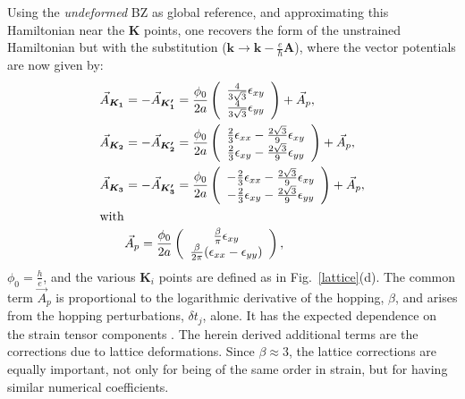 Using the \emph{undeformed} BZ as global reference, and approximating this Hamiltonian near the $\bm{K}$ points, one recovers the form of the unstrained Hamiltonian but with the substitution ($\bm{k} \to \bm{k}-\frac{e}{\hbar} \bm{A}$), where the vector potentials are now given by:
\begin{subequations}\label{pvp-all}
\begin{align}
\vec{A}_{\bm{K_1}}&=-\vec{A}_{\bm{K_1'}}=\frac{\phi_0}{2a} \left( \begin{array}{c} \frac{4}{3\sqrt{3}}\epsilon_{xy}\\ \frac{4}{3 \sqrt{3}} \epsilon_{yy} \end{array} \right) +\vec{A}_p , \label{pvpK1}\\ 
\vec{A}_{\bm{K_2}}&=-\vec{A}_{\bm{K_2'}}=\frac{\phi_0}{2a} \left( \begin{array}{c} \frac{2}{3}\epsilon_{xx}-\frac{2\sqrt{3}}{9} \epsilon_{xy} \\ \frac{2}{3} \epsilon_{xy}-\frac{2 \sqrt{3}}{9} \epsilon_{yy} \end{array} \right)+\vec{A}_p  , \label{pvpK2} \\
\vec{A}_{\bm{K_3}}&=-\vec{A}_{\bm{K_3'}}=\frac{\phi_0}{2a} \left( \begin{array}{c} -\frac{2}{3} \epsilon_{xx}-\frac{2 \sqrt{3}}{9} \epsilon_{xy} \\ -\frac{2}{3} \epsilon_{xy}-\frac{2 \sqrt{3}}{9} \epsilon_{yy} \end{array} \right)+\vec{A}_p  , \label{pvpK3} \\
\intertext{with}
&\vec{A}_p=\frac{\phi_0}{2a} \left( \begin{array}{c} \frac{\beta }{\pi} \epsilon_{xy} \\ \frac{\beta }{2 \pi} (\epsilon_{xx}-\epsilon_{yy}) \end{array} \right),
\label{pvpe}
\end{align}
\end{subequations}
$\phi_0=\frac{h}{e}$, and the various $\bm{K}_i$ points are defined as in Fig.~\ref{lattice}(d).
The common term $\vec{A}_p$ is proportional to the logarithmic derivative of the hopping, $\beta$, and arises from the hopping perturbations, $\delta t_j$, alone.
It has the expected dependence on the strain tensor components \cite{CastroNeto2009,Vozmediano2010}. 
The herein derived additional terms are the corrections due to lattice deformations.
Since $\beta \approx 3$, the lattice corrections are equally important, not only for being of the same order in strain, but for having similar numerical coefficients.
